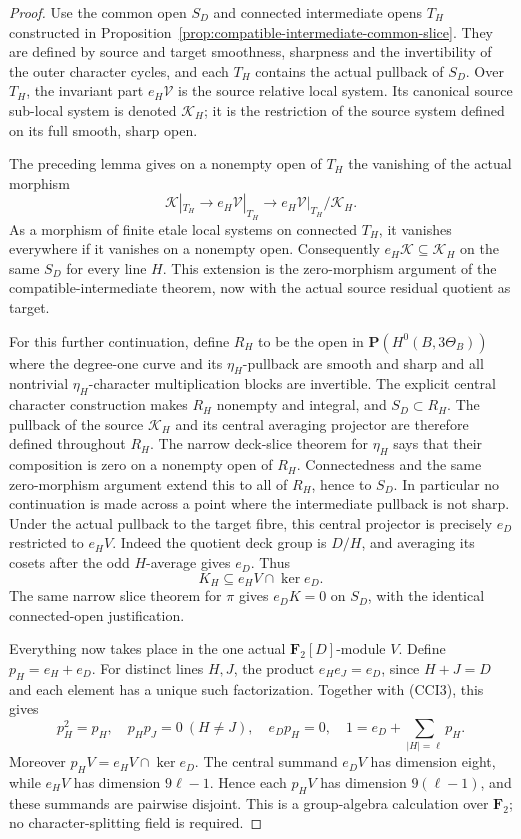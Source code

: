 \begin{proof}
Use the common open \(S_D\) and connected intermediate opens
\(T_H\) constructed in
Proposition~\ref{prop:compatible-intermediate-common-slice}.
They are defined by source and target smoothness, sharpness and
the invertibility of the outer character cycles, and each \(T_H\)
contains the actual pullback of \(S_D\).
Over \(T_H\), the invariant part \(e_H\mathcal V\) is the
source relative local system. Its canonical source sub-local
system is denoted \(\mathcal K_H\); it is the restriction of
the source system defined on its full smooth, sharp open.

The preceding lemma gives on a nonempty open of \(T_H\) the
vanishing of the actual morphism
\[
 \mathcal K|_{T_H}\longrightarrow e_H\mathcal V|_{T_H}
           \longrightarrow e_H\mathcal V|_{T_H}/\mathcal K_H.
 \tag{DE-CR5}
\]
As a morphism of finite etale local systems on connected \(T_H\),
it vanishes everywhere if it vanishes on a nonempty open.
Consequently \(e_H\mathcal K\subseteq\mathcal K_H\) on
the same \(S_D\) for every line \(H\). This extension is the
zero-morphism argument of the compatible-intermediate theorem,
now with the actual source residual quotient as target.

For this further continuation, define \(R_H\) to be the open
in \(\mathbf P(H^0(B,3\Theta_B))\) where the degree-one curve
and its \(\eta_H\)-pullback are smooth and sharp and all
nontrivial \(\eta_H\)-character multiplication blocks are
invertible. The explicit central character construction makes
\(R_H\) nonempty and integral, and \(S_D\subset R_H\).
The pullback of the source \(\mathcal K_H\) and its central
averaging projector are therefore defined throughout \(R_H\).
The narrow deck-slice theorem for \(\eta_H\) says that their
composition is zero on a nonempty open of \(R_H\). Connectedness
and the same zero-morphism argument extend this to all of
\(R_H\), hence to \(S_D\). In particular no continuation is
made across a point where the intermediate pullback is not sharp.
Under the actual pullback to the target fibre, this central
projector is precisely \(e_D\) restricted to \(e_HV\).
Indeed the quotient deck group is \(D/H\), and averaging its
cosets after the odd \(H\)-average gives \(e_D\). Thus
\[
           K_H\subseteq e_HV\cap\ker e_D.
 \tag{DE-CR6}
\]
The same narrow slice theorem for \(\pi\) gives \(e_DK=0\)
on \(S_D\), with the identical connected-open justification.

Everything now takes place in the one actual
\(\mathbf F_2[D]\)-module \(V\). Define
\(p_H=e_H+e_D\). For distinct lines \(H,J\), the product
\(e_He_J=e_D\), since \(H+J=D\) and each element has a
unique such factorization. Together with (CCI3), this gives
\[
 p_H^2=p_H,\quad p_Hp_J=0\ (H\ne J),\quad
 e_Dp_H=0,\quad 1=e_D+\sum_{|H|=\ell}p_H.
 \tag{DE-CR7}
\]
Moreover \(p_HV=e_HV\cap\ker e_D\). The central summand
\(e_DV\) has dimension eight, while \(e_HV\) has dimension
\(9\ell-1\). Hence each \(p_HV\) has dimension
\(9(\ell-1)\), and these summands are pairwise disjoint.
This is a group-algebra calculation over \(\mathbf F_2\);
no character-splitting field is required.


\end{proof}
